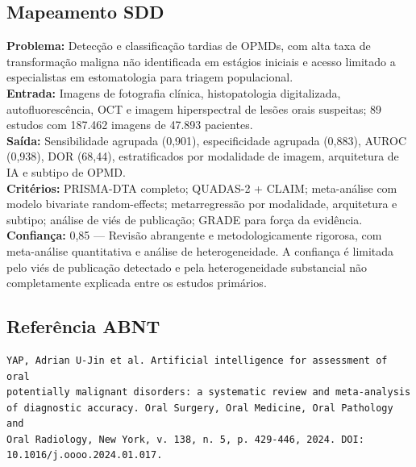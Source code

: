 \subsection{Mapeamento SDD}
\textbf{Problema:} Detecção e classificação tardias de OPMDs, com
alta taxa de transformação maligna não identificada em estágios
iniciais e acesso limitado a especialistas em estomatologia para
triagem populacional. \\
\textbf{Entrada:} Imagens de fotografia clínica, histopatologia
digitalizada, autofluorescência, OCT e imagem hiperspectral de lesões
orais suspeitas; 89 estudos com 187.462 imagens de 47.893 pacientes. \\
\textbf{Saída:} Sensibilidade agrupada (0,901), especificidade
agrupada (0,883), AUROC (0,938), DOR (68,44), estratificados por
modalidade de imagem, arquitetura de IA e subtipo de OPMD. \\
\textbf{Critérios:} PRISMA-DTA completo; QUADAS-2 + CLAIM; meta-análise
com modelo bivariate random-effects; metarregressão por modalidade,
arquitetura e subtipo; análise de viés de publicação; GRADE para
força da evidência. \\
\textbf{Confiança:} 0,85 — Revisão abrangente e metodologicamente
rigorosa, com meta-análise quantitativa e análise de heterogeneidade.
A confiança é limitada pelo viés de publicação detectado e pela
heterogeneidade substancial não completamente explicada entre os
estudos primários.
\subsection{Referência ABNT}
\begin{verbatim}
YAP, Adrian U-Jin et al. Artificial intelligence for assessment of oral
potentially malignant disorders: a systematic review and meta-analysis
of diagnostic accuracy. Oral Surgery, Oral Medicine, Oral Pathology and
Oral Radiology, New York, v. 138, n. 5, p. 429-446, 2024. DOI:
10.1016/j.oooo.2024.01.017.
\end{verbatim}
\endinput
